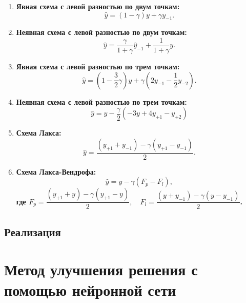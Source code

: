 \documentclass[12pt, a4paper]{article}
\begin{document}
\begin{enumerate}
	
	\item \bf{Явная схема с левой разностью по двум точкам}:
	\begin{equation*}
		\widehat{y} = (1 - \gamma) y + \gamma y_{-1}.
	\end{equation*}
	
	\item \bf{Неявная схема с левой разностью по двум точкам}:
	\begin{equation*}
		\widehat{y} = \dfrac{\gamma}{1 + \gamma} \widehat{y}_{-1} + \dfrac{1}{1 + \gamma} y .
	\end{equation*}
	
	\item \bf{Явная схема с левой разностью по трем точкам}:
	\begin{equation*}
		\widehat{y} = (1 - \frac{3}{2}\gamma) y + \gamma(2y_{-1} - \frac{1}{2}y_{-2}) .
	\end{equation*}
	
	\item \bf{Неявная схема с левой разностью по трем точкам}:
	\begin{equation*}
		\widehat{y} = y - \frac{\gamma}{2} (-3y + 4y_{+1} - y_{+2})
	\end{equation*}
	
	\item \bf{Схема Лакса}:
	\begin{equation*}
		\widehat{y} = \dfrac{(y_{+1} + y_{-1}) - \gamma(y_{+1} - y_{-1})}{2} .
	\end{equation*}
	
	\item \bf{Схема Лакса-Вендрофа}:
	\begin{equation*}
		\widehat{y} = y - \gamma(F_p - F_l),
	\end{equation*}
	где $ F_p = \dfrac{(y_{+1} + y) - \gamma (y_{+1} - y)}{2}, \quad F_l = \dfrac{(y + y_{-1}) - \gamma (y - y_{-1})}{2} $.
\end{enumerate}

\subsection{Реализация}



\section{Метод улучшения решения с помощью нейронной сети}
\end{document}

